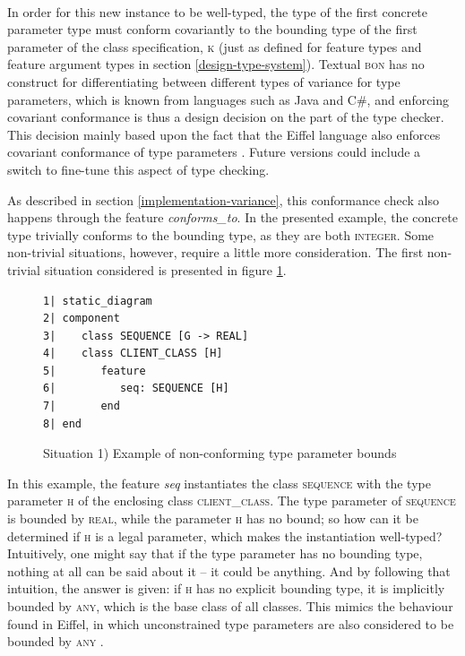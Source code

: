 \paragraph{} In order for this new instance to be well-typed, the type of the first concrete parameter type must conform covariantly to the bounding type of the first parameter of the class specification, \textsc{k} (just as defined for feature types and feature argument types in section \ref{design-type-system}). Textual \textsc{bon} has no construct for differentiating between different types of variance for type parameters, which is known from languages such as Java and C\#, and enforcing covariant conformance is thus a design decision on the part of the type checker. This decision mainly based upon the fact that the Eiffel language also enforces covariant conformance of type parameters \cite[Constrained~genericity]{meyer2001}. Future versions could include a switch to fine-tune this aspect of type checking.

As described in section \ref{implementation-variance}, this conformance check also happens through the feature \textit{conforms\_to}. In the presented example, the concrete type trivially conforms to the bounding type, as they are both \textsc{integer}. Some non-trivial situations, however, require a little more consideration.
The first non-trivial situation considered is presented in figure \ref{fig:non_conforming_type_bounds}.
\begin{figure}[H]
{\footnotesize
\begin{verbatim}
1| static_diagram
2| component
3|    class SEQUENCE [G -> REAL]
4|    class CLIENT_CLASS [H]
5|       feature
6|          seq: SEQUENCE [H]
7|       end
8| end
\end{verbatim}
}
\caption{Situation 1) Example of non-conforming type parameter bounds}
\label{fig:non_conforming_type_bounds}
\end{figure}
In this example, the feature \textit{seq} instantiates the class \textsc{sequence} with the type parameter \textsc{h} of the enclosing class \textsc{client\_class}. The type parameter of \textsc{sequence} is bounded by \textsc{real}, while the parameter \textsc{h} has no bound; so how can it be determined if \textsc{h} is a legal parameter, which makes the instantiation well-typed? Intuitively, one might say that if the type parameter has no bounding type, nothing at all can be said about it -- it could be anything. And by following that intuition, the answer is given: if \textsc{h} has no explicit bounding type, it is implicitly bounded by \textsc{any}, which is the base class of all classes. This mimics the behaviour found in Eiffel, in which unconstrained type parameters are also considered to be bounded by \textsc{any} \cite[p.~77]{meyer2001}.

